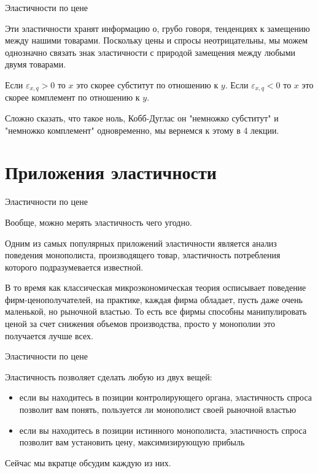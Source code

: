 \documentclass{beamer}
\begin{document}
\begin{frame}{Эластичности по цене}

Эти эластичности хранят информацию о, грубо говоря, тенденциях к замещению между нашими товарами. Поскольку цены и спросы неотрицательны, мы можем однозначно связать знак эластичности с природой замещения между любыми двумя товарами.

Если $\varepsilon_{x,q} > 0$ то $x$ это скорее субститут по отношению к $y$. Если $\varepsilon_{x,q} < 0$ то $x$ это скорее комплемент по отношению к $y$.

Сложно сказать, что такое ноль, Кобб-Дуглас он "немножко субститут" и "немножко комплемент" одновременно, мы вернемся к этому в 4 лекции.

\end{frame}

\section{Приложения эластичности}

\begin{frame}{Эластичности по цене}

Вообще, \alert{можно мерять эластичность чего угодно}.

Одним из самых популярных приложений эластичности является анализ поведения монополиста, производящего товар, эластичность потребления которого подразумевается известной.

В то время как классическая микроэкономическая теория осписывает поведение фирм-ценополучателей, на практике, каждая фирма обладает, пусть даже очень маленькой, но рыночной властью. То есть все фирмы способны манипулировать ценой за счет снижения объемов производства, просто у монополии это получается лучше всех.

\end{frame}

\begin{frame}{Эластичности по цене}

Эластичность позволяет сделать любую из двух вещей:

\begin{itemize}
\item если вы находитесь в позиции контролирующего органа, эластичность спроса позволит вам понять, пользуется ли монополист своей рыночной властью
\item если вы находитесь в позиции истинного монополиста, эластичность спроса позволит вам установить цену, максимизирующую прибыль
\end{itemize}

Сейчас мы вкратце обсудим каждую из них.

\end{frame}
\end{document}
